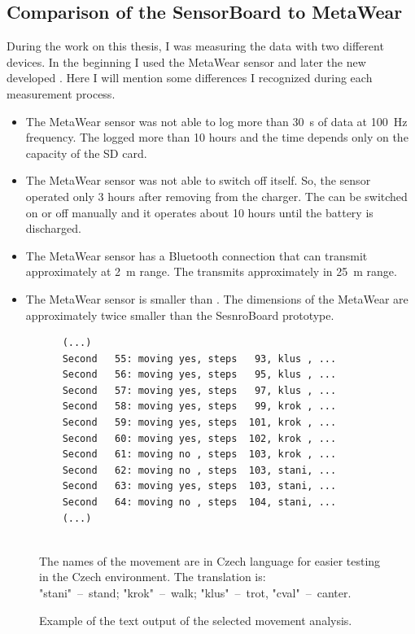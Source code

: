 \subsection{Comparison of the SensorBoard to MetaWear}
During the work on this thesis, I was measuring the data with two different devices. In the beginning I used the MetaWear \cite{MetaWear} sensor and later the new developed . Here I will mention some differences I recognized during each measurement process.
\begin{itemize}
    \item The MetaWear sensor was not able to log more than \SI{30}{s} of data at \SI{100}{Hz} frequency. The  logged more than 10 hours and the time depends only on the capacity of the SD card.
    \item The MetaWear sensor was not able to switch off itself. So, the sensor operated only 3 hours after removing from the charger. The  can be switched on or off manually and it operates about 10 hours until the battery is discharged.
    \item The MetaWear sensor has a Bluetooth connection that can transmit approximately at \SI{2}{m} range. The  transmits approximately in \SI{25}{m} range.
    \item The MetaWear sensor is smaller than . The dimensions of the MetaWear are approximately twice smaller than the SesnroBoard prototype.
\end{itemize}

\begin{figure}[H]
	\centering
	\caption{Example of the text output of the selected movement analysis.}
	\label{fig:textOutputAnalysis}
	\begin{verbatim}
	(...)
	Second   55: moving yes, steps   93, klus , ...
	Second   56: moving yes, steps   95, klus , ...
	Second   57: moving yes, steps   97, klus , ...
	Second   58: moving yes, steps   99, krok , ...
	Second   59: moving yes, steps  101, krok , ...
	Second   60: moving yes, steps  102, krok , ...
	Second   61: moving no , steps  103, krok , ...
	Second   62: moving no , steps  103, stani, ...
	Second   63: moving yes, steps  103, stani, ...
	Second   64: moving no , steps  104, stani, ...
	(...)
	\end{verbatim}
	\raggedright
	\quad\\The names of the movement are in Czech language for easier testing in the Czech environment. The translation is:\\"stani"~--~stand; "krok"~--~walk; "klus"~--~trot, "cval"~--~canter.
\end{figure}

